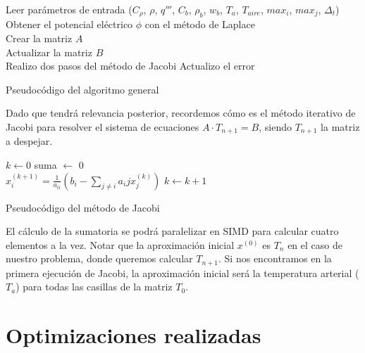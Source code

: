 \documentclass[a4paper]{article}
\begin{document}
\begin{algorithm}[H]
Leer par\'ametros de entrada ($C_{\rho}$, $\rho$, $q'''$, $C_b$, $\rho_b$, $w_b$, $T_a$, $T_{aire}$, $max_i$, $max_j$, $\Delta_t$) \\
Obtener el potencial el\'ectrico $\phi$ con el método de Laplace \\
Crear la matriz $A$ \\

 {
	Actualizar la matriz $B$ \\
	 {
		Realizo dos pasos del método de Jacobi
		Actualizo el error
	}
}
\caption{Pseudocódigo del algoritmo general}
\end{algorithm}

\bigskip

Dado que tendrá relevancia posterior, recordemos cómo es el método 
iterativo de Jacobi para resolver el sistema de ecuaciones 
$A \cdot T_{n+1} = B$, siendo $T_{n+1}$ la matriz a despejar.\\

\begin{algorithm}[H]

$k \leftarrow 0$
 {
	suma $\leftarrow$ 0 \\
	 {
		$x_i^{(k+1)} = \frac{1}{a_{ii}}(b_i - \sum_{j \neq i} {a_ij x_j^{(k)}})$
	}
	$k \leftarrow k + 1$
}
\caption{Pseudocódigo del método de Jacobi}
\end{algorithm}

\bigskip

El cálculo de la sumatoria se podrá paralelizar en SIMD para calcular 
cuatro elementos a la vez. Notar que la aproximación inicial $x^{(0)}$ 
es $T_n$ en el caso de nuestro problema, donde queremos calcular $T_{n+1}$. 
Si nos encontramos en la primera ejecución de Jacobi, la aproximación 
inicial será la temperatura arterial ($T_a$) para todas las casillas 
de la matriz $T_0$. \\

\newpage

\section{Optimizaciones realizadas}
\end{document}
